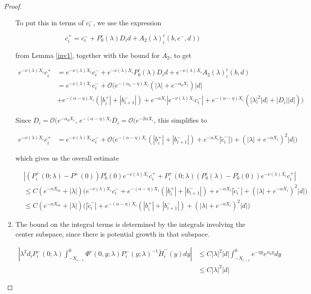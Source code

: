 \documentclass[thesis.tex]{subfiles}
\begin{document}
\begin{lemma}
\begin{proof}
\begin{enumerate}
To put this in terms of $c_i^-$, we use the expression

\[
c_i^+ = c_i^- + P_0^c(\lambda) D_i d + A_2(\lambda)_i^c(b, c^-, d) )
\]

from Lemma \ref{inv1}, together with the bound for $A_2$, to get

\begin{align*}
e^{-\nu(\lambda)X_i} c_i^+ &= e^{-\nu(\lambda)X_i} c_i^- 
+ e^{-\nu(\lambda)X_i} P_0^c(\lambda) D_i d + e^{-\nu(\lambda)X_i} A_2(\lambda)_i^c(b, d)\\
&= e^{-\nu(\lambda)X_i} c_i^- + \mathcal{O}\Big( e^{-(\alpha_0 - \eta) X_i} ( |\lambda| + e^{-\alpha_0 X_i} ) |d| \\
&+ e^{-(\alpha - \eta) X_i} (|b_i^+| + |b_{i+1}^-|) + e^{-\alpha X_i} |e^{-\nu(\lambda)X_i} c_i^-| + e^{-(\alpha - \eta) X_i}(|\lambda|^2|d| + |D_i||d| ) \Big)
\end{align*}

Since $D_i = \mathcal{O}(e^{-\alpha_0 X_i}$, $e^{-(\alpha - \eta) X_i} D_i = \mathcal{O}(e^{-2 \alpha X_i}$, this simplifies to

\begin{align}\label{tildecminus2}
e^{-\nu(\lambda)X_i} c_i^+
&= e^{-\nu(\lambda)X_i} c_i^- + \mathcal{O}\Big( 
e^{-(\alpha - \eta) X_i} (|b_i^+| + |b_{i+1}^-|) + e^{-\alpha X_i} |\tilde{c}_i^-|) 
+ ( |\lambda| + e^{-\alpha X_i} )^2 |d| \Big)
\end{align}

which gives us the overall estimate

\begin{align*}
&|(P_i^+(0; \lambda) - P^+(0))P_0^c(0) e^{-\nu(\lambda)X_i} c_i^+ + P_i^+(0; \lambda) (P_0^c(\lambda) - P_0^c(0)) e^{-\nu(\lambda)X_i} c_i^+| \\
&\leq C (e^{-\alpha X_m} + |\lambda|) \Big( e^{-\nu(\lambda)X_i} c_i^-  
+ e^{-(\alpha - \eta) X_i} (|b_i^+| + |b_{i+1}^-|) + e^{-\alpha X_i} |\tilde{c}_i^-| 
+ ( |\lambda| + e^{-\alpha X_i} )^2 |d| \Big) \\
&\leq C (e^{-\alpha X_m} + |\lambda|) \Big( |\tilde{c}_i^-|  
+ e^{-(\alpha - \eta) X_i} (|b_i^+| + |b_{i+1}^-|) 
+ ( |\lambda| + e^{-\alpha X_i} )^2 |d| \Big)
\end{align*}

\item The bound on the integral terms is determined by the integrals involving the center subspace, since there is potential growth in that subspace.

\begin{align*}
\left| \lambda^2 d_i P_i^-(0; \lambda) \int_{-X_{i-1}}^0 \Phi^c(0, y; \lambda) P_i^-(y; \lambda)^{-1} \tilde{H}_i^-(y) dy \right| &\leq C |\lambda|^2 |d| \int_{-X_{i-1}}^0 e^{-\eta y} e^{\alpha_0 y} dy \\
&\leq C |\lambda|^2 |d|
\end{align*}


\end{enumerate}
\end{proof}
\end{lemma}
\end{document}
